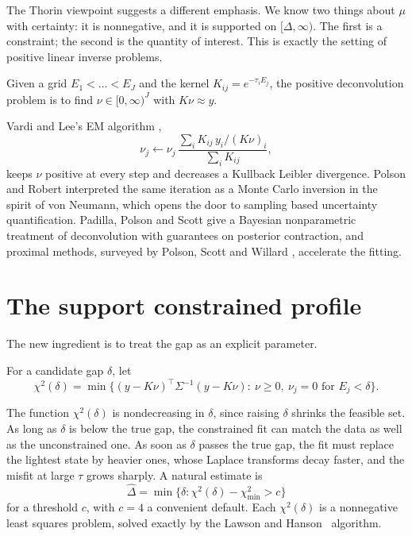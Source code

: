The Thorin viewpoint suggests a different emphasis. We know two things about $\mu$ with certainty: it is nonnegative, and it is supported on $[\Delta,\infty)$. The first is a constraint; the second is the quantity of interest. This is exactly the setting of positive linear inverse problems.

\begin{definition}
Given a grid $E_1<\dots<E_J$ and the kernel $K_{ij}=e^{-\tau_iE_j}$, the positive deconvolution problem is to find $\nu\in[0,\infty)^J$ with $K\nu\approx y$.
\end{definition}

Vardi and Lee's EM algorithm \cite{VL},
\[
\nu_j\leftarrow\nu_j\,\frac{\sum_iK_{ij}\,y_i/(K\nu)_i}{\sum_iK_{ij}},
\]
keeps $\nu$ positive at every step and decreases a Kullback Leibler divergence. Polson and Robert \cite{PR} interpreted the same iteration as a Monte Carlo inversion in the spirit of von Neumann, which opens the door to sampling based uncertainty quantification. Padilla, Polson and Scott \cite{PPS} give a Bayesian nonparametric treatment of deconvolution with guarantees on posterior contraction, and proximal methods, surveyed by Polson, Scott and Willard \cite{PSW15}, accelerate the fitting.

\section{The support constrained profile}

The new ingredient is to treat the gap as an explicit parameter.

\begin{definition}
For a candidate gap $\delta$, let
\[
\chi^2(\delta)=\min\Big\{(y-K\nu)^\top\Sigma^{-1}(y-K\nu):\ \nu\ge0,\ \nu_j=0\text{ for }E_j<\delta\Big\}.
\]
\end{definition}

The function $\chi^2(\delta)$ is nondecreasing in $\delta$, since raising $\delta$ shrinks the feasible set. As long as $\delta$ is below the true gap, the constrained fit can match the data as well as the unconstrained one. As soon as $\delta$ passes the true gap, the fit must replace the lightest state by heavier ones, whose Laplace transforms decay faster, and the misfit at large $\tau$ grows sharply. A natural estimate is
\[
\hat\Delta=\min\{\delta:\chi^2(\delta)-\chi^2_{\min}>c\}
\]
for a threshold $c$, with $c=4$ a convenient default. Each $\chi^2(\delta)$ is a nonnegative least squares problem, solved exactly by the Lawson and Hanson~\cite{LH74} algorithm.

